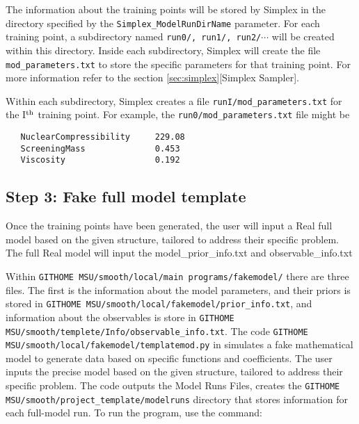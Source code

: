 \documentclass[main.tex]{subfiles}
\begin{document}
The information about the training points will be stored by Simplex in the directory specified by the {\tt Simplex\_ModelRunDirName} parameter. For each training point, a subdirectory named {\tt run0/, run1/, run2/}$\cdots$ will be created within this directory. Inside each subdirectory, Simplex will create the file {\tt mod\_parameters.txt} to store the specific parameters for that training point. For more information refer to the section \ref{sec:simplex}[Simplex Sampler].

Within each subdirectory, Simplex creates a file {\tt runI/mod\_parameters.txt} for the I$^{\rm th}$ training point. For example, the {\tt run0/mod\_parameters.txt} file might be
{\tt\begin{verbatim}
   NuclearCompressibility     229.08
   ScreeningMass              0.453
   Viscosity                  0.192
\end{verbatim}
}


\subsection{Step 3: Fake full model template}
Once the training points have been generated, the user will input a Real full model based on the given structure, tailored to address their specific problem. The full Real model will input the model\_prior\_info.txt and observable\_info.txt

Within {\tt GITHOME MSU/smooth/local/main programs/fakemodel/} there are three files. The first is the information about the model parameters, and their priors is stored in {\tt GITHOME MSU/smooth/local/fakemodel/prior\_info.txt}, and information about the observables is store in {\tt GITHOME MSU/smooth/templete/Info/observable\_info.txt}. The code
{\tt GITHOME MSU/smooth/local/fakemodel/templatemod.py} in simulates a fake mathematical model to generate data based on specific functions and coefficients. The user inputs the precise model based on the given structure, tailored to address their specific problem. The code outputs the Model Runs Files, creates the {\tt GITHOME MSU/smooth/project\_template/modelruns} directory that stores information for each full-model run.
To run the program, use the command:
\end{document}
